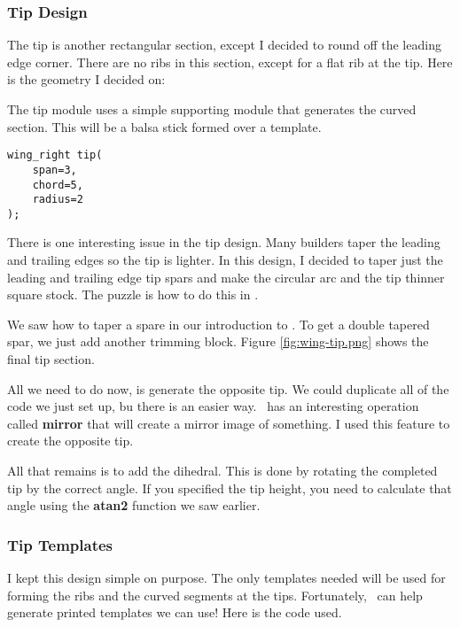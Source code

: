 
\subsubsection{Tip Design}

The tip is another rectangular section, except I decided to round off the
leading edge corner. There are no ribs in this section, except for a flat rib
at the tip. Here is the geometry I decided on:


The tip module uses a simple supporting module that generates the curved section.
This will be a balsa stick formed over a template.

\begin{lstlisting}
wing_right tip(
    span=3, 
    chord=5, 
    radius=2
);
\end{lstlisting}

There is one interesting issue in the tip design. Many builders taper the
leading and trailing edges so the tip is lighter. In this design, I decided to
taper just the leading and trailing edge tip spars and make the circular arc
and the tip thinner square stock. The puzzle is how to do this in \osc.

We saw how to taper a spare in our introduction to \osc. To get a double
tapered spar, we just add another trimming block.  Figure
\ref{fig:wing-tip.png} shows the final tip section.


All we need to do now, is generate the opposite tip. We could duplicate all of
the code we just set up, bu there is an easier way. \osc\ has an interesting
operation called {\bf mirror} that will create a mirror image of something. I
used this feature to create the opposite tip.

All that remains is to add the dihedral. This is done by rotating the completed
tip by the correct angle. If you specified the tip height, you need to calculate
that angle using the {\bf atan2} function we saw earlier.


\subsubsection{Tip Templates}

I kept this design simple on purpose. The only templates needed will be used
for forming the ribs and the curved segments at the tips. Fortunately, \osc\ can help
generate printed templates we can use! Here is the code used.

